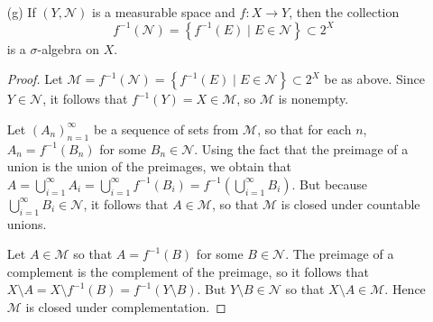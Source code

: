 \documentclass[11pt]{article}
\newcommand{\cbr}[1]{\left\{#1\right\}}
\begin{document}
\begin{enumerate}
\begin{enumerate}
\begin{proof}
        Let $B\in \mathscr{M}_E$ so that $B = A\cap E$ for some $A\in\mathscr{M}$. Then \begin{align*}
          E\setminus B = E\setminus (A\cap E) &= E\cap (X\setminus(A\cap E))\\
          &= (E\cap(X\setminus A))\cup(E\cap(X\setminus E))\\
          &= E\cap(X\setminus A),
        \end{align*} but $X\setminus A\in\mathscr{M}$ so that $E\setminus B\in\mathscr{M}_E$. It follows that $\mathscr{M}_E$ is closed under complementation.

        Thus $\mathscr{M}_E$ is a $\sigma$-algebra on $E$.
      \end{proof} 
      \item[(g)] If $(Y,\mathscr{N})$ is a measurable space and $f\colon X\to Y$, then the collection \[f^{-1}(\mathscr{N}) = \cbr{f^{-1}(E)\mid E\in\mathscr{N}}\subset 2^X\] is a $\sigma$-algebra on $X$. \begin{proof}
        Let $\mathscr{M} = f^{-1}(\mathscr{N})= \cbr{f^{-1}(E)\mid E\in\mathscr{N}}\subset 2^X$ be as above. Since $Y\in\mathscr{N}$, it follows that $f^{-1}(Y) = X\in \mathscr{M}$, so $\mathscr{M}$ is nonempty. 

        Let $(A_n)_{n=1}^\infty$ be a sequence of sets from $\mathscr{M}$, so that for each $n$, $A_n = f^{-1}(B_n)$ for some $B_n\in\mathscr{N}$. Using the fact that the preimage of a union is the union of the preimages, we obtain that $A = \bigcup_{i=1}^\infty A_i = \bigcup_{i=1}^\infty f^{-1}(B_i) = f^{-1}\left(\bigcup_{i=1}^\infty B_i \right)$. But because $\bigcup_{i=1}^\infty B_i\in \mathscr{N}$, it follows that $A\in\mathscr{M}$, so that $\mathscr{M}$ is closed under countable unions.

        Let $A\in \mathscr{M}$ so that $A = f^{-1}(B)$ for some $B\in\mathscr{N}$. The preimage of a complement is the complement of the preimage, so it follows that $X\setminus A = X\setminus f^{-1}(B) = f^{-1}(Y\setminus B)$. But $Y\setminus B\in\mathscr{N}$ so that $X\setminus A\in\mathscr{M}$. Hence $\mathscr{M}$ is closed under complementation.


\end{proof}
\end{enumerate}
\end{enumerate}
\end{document}
